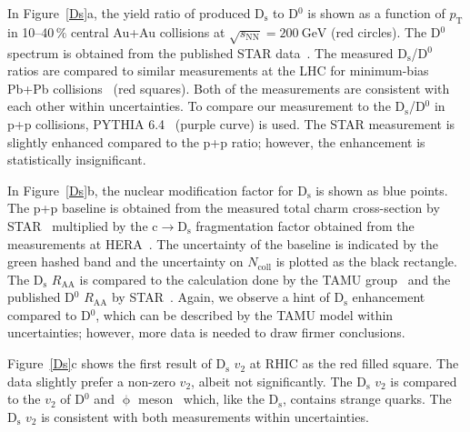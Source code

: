 In Figure~\ref{Ds}a, the yield ratio of produced 
D$_\mathrm{s}$ to D$^0$ is shown as a function of $p_\mathrm{T}$ in 10--40$\,\%$ central
Au+Au collisions at $\sqrt{s_\mathrm{NN}} = \SI{200}{\giga\electronvolt}$
(red circles)\@. The D$^0$ spectrum is obtained from the published STAR 
data~\cite{publishedDzero}\nocite{DavidThesis}\@. The measured D$_\mathrm{s}$/D$^0$
ratios are compared to similar measurements at the LHC for minimum-bias Pb+Pb collisions~\cite{ALICEds}
(red squares)\@. Both of the measurements are consistent with each other within uncertainties. 
To compare our measurement to the D$_\mathrm{s}$/D$^0$ in p+p collisions, 
PYTHIA 6.4~\cite{PYTHIA} (purple curve) is used\@. The STAR measurement is slightly
enhanced compared to the p+p ratio; however, the enhancement is statistically insignificant.

In Figure~\ref{Ds}b, the nuclear modification factor for D$_\mathrm{s}$ is shown as blue points. 
The p+p baseline is obtained from
the measured total charm cross-section by STAR~\cite{inclusiveC} multiplied by the 
$\mathrm{c}\rightarrow\mathrm{D_s}$
fragmentation factor obtained from the measurements at HERA~\cite{H1,ZEUS}\@.
The uncertainty of the baseline is indicated by the
green hashed band and the uncertainty on $N_\mathrm{coll}$ is plotted
as the black rectangle.
The D$_\mathrm{s}$ $R_\mathrm{AA}$ is compared to the calculation done by the TAMU
group~\cite{DsTAMU} and the published D$^0$ $R_\mathrm{AA}$ by
STAR~\cite{publishedDzero}\@. Again, we observe a hint of D$_\mathrm{s}$ enhancement compared 
to D$^0$, which can be described
by the TAMU model within uncertainties; however, more data is needed to draw firmer conclusions.

Figure~\ref{Ds}c shows the first result of D$_\mathrm{s}$ $v_2$ at RHIC as the red filled square.
The data slightly prefer a non-zero $v_2$, albeit not significantly. The D$_\mathrm{s}$ $v_2$ is
compared to the $v_2$ of D$^0$ and $\upphi$
meson~\cite{phi} which, like the D$_\mathrm{s}$, contains strange quarks. 
The D$_\mathrm{s}$ $v_2$ is consistent with both measurements within uncertainties.


